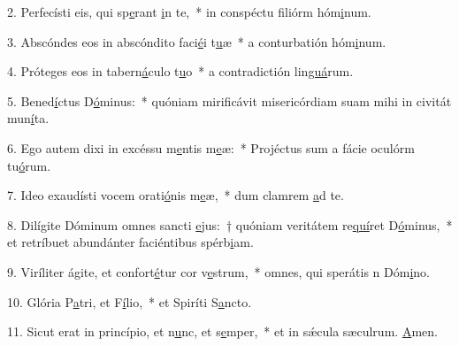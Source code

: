 2. Perfecísti eis, qui sp\uline{e}rant \uline{i}n te,~* in conspéctu filiórm hóm\uline{i}num.\par 
3. Abscóndes eos in abscóndito faci\uline{é}i t\uline{u}æ~* a conturbatión hóm\uline{i}num.\par 
4. Próteges eos in tabern\uline{á}culo t\uline{u}o~* a contradictión lin\uline{guá}rum.\par 
5. Bened\uline{í}ctus D\uline{ó}minus:~* quóniam mirificávit misericórdiam suam mihi in civitát mun\uline{í}ta.\par 
6. Ego autem dixi in excéssu m\uline{e}ntis m\uline{e}æ:~* Projéctus sum a fácie oculórm tu\uline{ó}rum.\par 
7. Ideo exaudísti vocem orati\uline{ó}nis m\uline{e}æ,~* dum clamrem \uline{a}d te.\par 
8. Dilígite Dóminum omnes sancti \uline{e}jus:~† quóniam veritátem re\uline{quí}ret D\uline{ó}minus,~* et retríbuet abundánter faciéntibus spérb\uline{i}am.\par 
9. Viríliter ágite, et confort\uline{é}tur cor v\uline{e}strum,~* omnes, qui sperátis n Dóm\uline{i}no.\par 
10. Glória P\uline{a}tri, et F\uline{í}lio,~* et Spiríti S\uline{a}ncto.\par 
11. Sicut erat in princípio, et n\uline{u}nc, et s\uline{e}mper,~* et in sǽcula sæculrum. \uline{A}men.\par 
